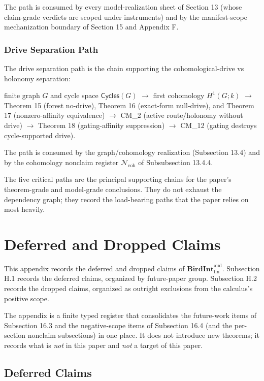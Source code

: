 \documentclass[11pt]{article}
\theoremstyle{definition}
\begin{document}
The path is consumed by every model-realization sheet of Section 13 (whose claim-grade verdicts are scoped under instruments) and by the manifest-scope mechanization boundary of Section 15 and Appendix F.

\subsubsection{Drive Separation Path}

The drive separation path is the chain supporting the cohomological-drive vs holonomy separation:

finite graph \(G\) and cycle space \(\mathsf{Cycles}(G)\) \(\to\) first cohomology \(H^{1}(G;k)\) \(\to\) Theorem 15 (forest no-drive), Theorem 16 (exact-form null-drive), and Theorem 17 (nonzero-affinity equivalence) \(\to\) CM\_2 (active route/holonomy without drive) \(\to\) Theorem 18 (gating-affinity suppression) \(\to\) CM\_12 (gating destroys cycle-supported drive).

The path is consumed by the graph/cohomology realization (Subsection 13.4) and by the cohomology nonclaim register \(\mathcal N_{\mathrm{coh}}\) of Subsubsection 13.4.4.

The five critical paths are the principal supporting chains for the paper's theorem-grade and model-grade conclusions. They do not exhaust the dependency graph; they record the load-bearing paths that the paper relies on most heavily.
 \section{Deferred and Dropped Claims}

This appendix records the deferred and dropped claims of \(\mathbf{BirdInt}^{\mathrm{aud}}_{\mathrm{fin}}\). Subsection H.1 records the deferred claims, organized by future-paper group. Subsection H.2 records the dropped claims, organized as outright exclusions from the calculus's positive scope.

The appendix is a finite typed register that consolidates the future-work items of Subsection 16.3 and the negative-scope items of Subsection 16.4 (and the per-section nonclaim subsections) in one place. It does not introduce new theorems; it records what is \emph{not} in this paper and \emph{not} a target of this paper.

\subsection{Deferred Claims}
\end{document}

